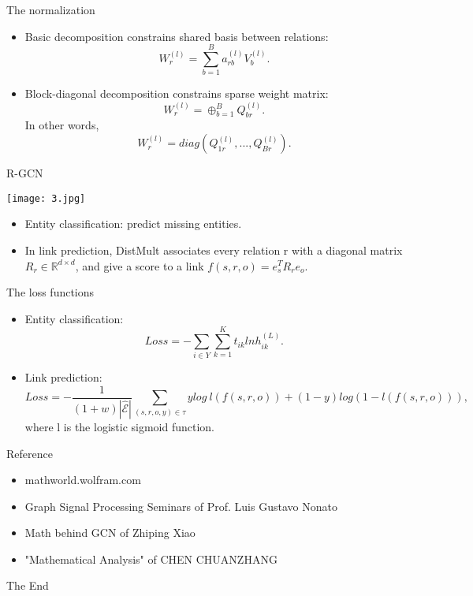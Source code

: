 \documentclass{beamer}
\begin{document}
		\begin{frame}{The normalization}
			\begin{itemize}
				\item Basic decomposition constrains shared basis between relations:
				\[
				W_r^{(l)} = \sum_{b=1}^{B}a_{rb}^{(l)}V_b^{(l)}.
				\]
				\item Block-diagonal decomposition constrains sparse weight matrix:
				\[
				W_r^{(l)} = \oplus_{b=1}^{B} Q_{br}^{(l)}.
				\]
				In other words, 
				\[
				W_r^{(l)} = diag(Q_{1r}^{(l)}, ..., Q_{Br}^{(l)}).
				\]
			\end{itemize}
		\end{frame}
		\begin{frame}{R-GCN}
			\begin{center}
				\texttt{[image: 3.jpg]}
			\end{center}
			\begin{itemize}
				\item Entity classification: predict missing entities.
				\item In link prediction, DistMult associates every relation r with a diagonal matrix $R_r \in \mathbb{R}^{d\times d}$, and give a score to a link $f(s,r,o)=e_s^TR_re_o$.
			\end{itemize}
		\end{frame}
		\begin{frame}{The loss functions}
			\begin{itemize}
				\item Entity classification:
				\[
				Loss = -\sum_{i \in Y}\sum_{k=1}^{K}t_{ik}lnh_{ik}^{(L)}.
				\]
				\item Link prediction:
				\[
				Loss = -\frac{1}{(1+w)|\hat{\mathcal{E}}|}\sum_{(s,r,o,y)\in \tau}ylog\ l(f(s, r, o)) + (1-y)log (1-l(f(s,r,o))),
				\]
				where l is the logistic sigmoid function.
			\end{itemize}
		\end{frame}
		\begin{frame}{Reference}
		\begin{itemize}
			\item mathworld.wolfram.com
			\item Graph Signal Processing Seminars of Prof. Luis Gustavo Nonato
			\item Math behind GCN of Zhiping Xiao
			\item  "Mathematical Analysis" of CHEN CHUANZHANG
		\end{itemize}
	\end{frame}
\begin{frame}{}
	\begin{center}
		\huge{The End}
	\end{center}
\end{frame}
\end{document}
